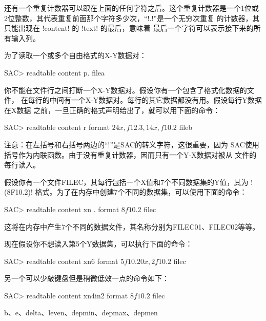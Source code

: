 还有一个重复计数器可以跟在上面的任何字符之后。这个重复计数器是一个1位或
2位整数，其代表重复前面那个字符多少次，``!.!''是一个无穷次重复
的计数器，其只能出现在 !content! 的 !text! 的最后，意味着
最后一个字符可以表示接下来的所有输入列。

为了读取一个或多个自由格式的X-Y数据对：
\begin{SACCode}
SAC> readtable content p. filea
\end{SACCode}

你不能在文件行之间打断一个X-Y数据对。假设你有一个包含了格式化数据的文件，
在每行的中间有一个X-Y数据对。每行的其它数据都没有用。假设每行Y数据在X数据
之前，一旦正确的格式声明给出了，就可以用下面的命令：
\begin{SACCode}
SAC> readtable content r format \(24x,f12.3,14x,f10.2\) fileb
\end{SACCode}
注意：在左括号和右括号两边的``!\!''是SAC的转义字符，这很重要，因为
SAC使用括号作为内联函数。由于没有重复计数器，因而只有一个Y-X数据对被从
文件的每行读入。

假设你有一个文件FILEC，其每行包括一个X值和7个不同数据集的Y值，其为
!(8F10.2)! 格式。为了在内存中创建7个不同的数据集，可以使用下面的命令：
\begin{SACCode}
SAC> readtable content xn . format \(8f10.2\) filec
\end{SACCode}
这将在内存中产生7个不同的数据文件，其名称分别为FILEC01、FILEC02等等。

现在假设你不想读入第5个Y数据集，可以执行下面的命令：
\begin{SACCode}
SAC> readtable content xn6 format \(5f10.20x,2f10.2\) filec
\end{SACCode}
另一个可以少敲键盘但是稍微低效一点的命令如下：
\begin{SACCode}
SAC> readtable content xn4in2 format \(8f10.2\) filec
\end{SACCode}

b、e、delta、leven、depmin、depmax、depmen
